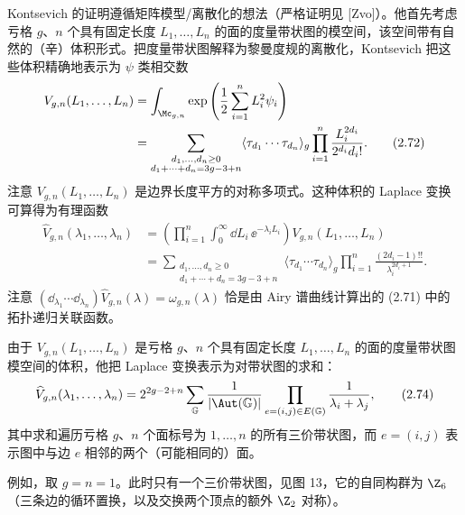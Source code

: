Kontsevich 的证明遵循矩阵模型/离散化的想法（严格证明见 [Zvo]）。他首先考虑亏格 $g$、$n$ 个具有固定长度 $L_1,\ldots,L_n$ 的面的度量带状图的模空间，该空间带有自然的（辛）体积形式。把度量带状图解释为黎曼度规的离散化，Kontsevich 把这些体积精确地表示为 $\psi$ 类相交数
\begin{align}
V_{g,n}(L_1,\ldots,L_n) &= \int_{\Mc_{g,n}}\exp\left(\frac{1}{2}\sum_{i=1}^{n}L_i^2\psi_i\right) \nonumber\\
&= \sum_{\substack{d_1,\ldots,d_n\ge0\\ d_1+\cdots+d_n=3g-3+n}}\langle\tau_{d_1}\cdots\tau_{d_n}\rangle_g\prod_{i=1}^{n}\frac{L_i^{2d_i}}{2^{d_i}d_i!}. \tag{2.72}
\end{align}
注意 $V_{g,n}(L_1,\ldots,L_n)$ 是边界长度平方的对称多项式。这种体积的 Laplace 变换可算得为有理函数
\begin{align}
\widehat{V}_{g,n}(\lambda_1,\ldots,\lambda_n) &= \left(\prod_{i=1}^{n}\int_0^\infty \dd L_i\,\ee^{-\lambda_iL_i}\right)V_{g,n}(L_1,\ldots,L_n) \nonumber\\
&= \sum_{\substack{d_1,\ldots,d_n\ge0\\ d_1+\cdots+d_n=3g-3+n}}\langle\tau_{d_1}\cdots\tau_{d_n}\rangle_g\prod_{i=1}^{n}\frac{(2d_i-1)!!}{\lambda_i^{2d_i+1}}. \tag{2.73}
\end{align}
注意 $(\dd_{\lambda_1}\cdots\dd_{\lambda_n})\widehat{V}_{g,n}(\lambda)=\omega_{g,n}(\lambda)$ 恰是由 Airy 谱曲线计算出的 (2.71) 中的拓扑递归关联函数。

由于 $V_{g,n}(L_1,\ldots,L_n)$ 是亏格 $g$、$n$ 个具有固定长度 $L_1,\ldots,L_n$ 的面的度量带状图模空间的体积，他把 Laplace 变换表示为对带状图的求和：
\begin{equation}
\widehat{V}_{g,n}(\lambda_1,\ldots,\lambda_n)=2^{2g-2+n}\sum_{\mathbb{G}}\frac{1}{|\Aut(\mathbb{G})|}\prod_{e=(i,j)\in E(\mathbb{G})}\frac{1}{\lambda_i+\lambda_j}, \tag{2.74}
\end{equation}
其中求和遍历亏格 $g$、$n$ 个面标号为 $1,\ldots,n$ 的所有三价带状图，而 $e=(i,j)$ 表示图中与边 $e$ 相邻的两个（可能相同的）面。

例如，取 $g=n=1$。此时只有一个三价带状图，见图 13，它的自同构群为 $\Z_6$（三条边的循环置换，以及交换两个顶点的额外 $\Z_2$ 对称）。

